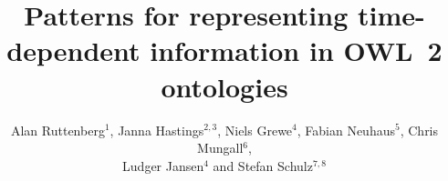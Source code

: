 \documentclass[10pt]{bmc_article}
\newenvironment{bmcformat}{\baselineskip20pt\sloppy\setboolean{publ}{false}}{\baselineskip20pt\sloppy}
\begin{document}
\begin{bmcformat}




\title{Patterns for representing time-dependent information in OWL~2 ontologies}

 

\author{Alan Ruttenberg\correspondingauthor$^1$,%
  Janna Hastings$^{2,3}$,%
  Niels Grewe$^{4}$,%
  Fabian Neuhaus$^{5}$,%
  Chris Mungall$^{6}$,%
   \\
  Ludger Jansen$^{4}$%
   and
  Stefan Schulz$^{7,8}$%
}
   

\address{%
    \iid(1)Department of X, State University of New York, Buffalo, NY, USA\\
    \iid(2)Cheminformatics and Metabolism, European Bioinformatics Insitute (EMBL-EBI), Cambridge, UK\\
    \iid(3)Department of Philosophy, University of Geneva, Switzerland\\
    \iid(4)Institute of Philosophy, University of Rostock, Germany\\
    \iid(5)National Institute of Standards and Technology\\
    \iid(6)Genomics Division, Lawrence Berkeley National Laboratory, Berkeley, CA, USA\\
    \iid(7)Institute for Medical Informatics,
Statistics and Documentation, Medical University of Graz, Austria\\
    \iid(8)Institute of Medical Biometry and Medical Informatics, University Medical Center Freiburg, Germany
}%


\end{bmcformat}
\end{document}

